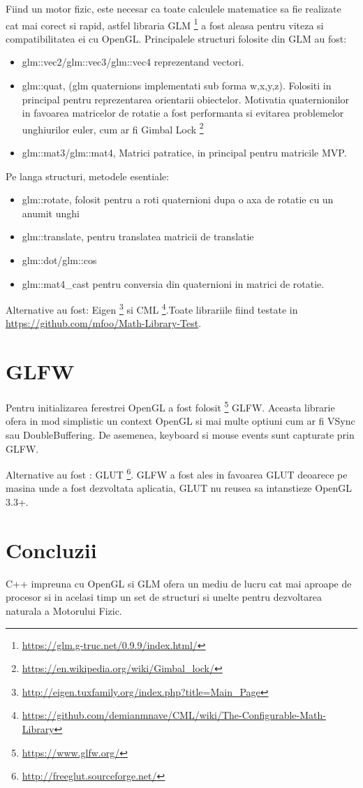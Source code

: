 Fiind un motor fizic, este necesar ca toate calculele matematice sa fie realizate cat mai corect si rapid, astfel libraria GLM \footnote{\url{https://glm.g-truc.net/0.9.9/index.html/}} a fost aleasa pentru viteza si compatibilitatea ei cu OpenGL.
Principalele structuri folosite din GLM au fost:
\begin{itemize}
    \item glm::vec2/glm::vec3/glm::vec4 reprezentand vectori. 
    \item glm::quat, (glm quaternions implementati sub forma w,x,y,z). Folositi in principal pentru reprezentarea orientarii obiectelor. Motivatia quaternionilor in favoarea 
    matricelor de rotatie a fost performanta si evitarea problemelor unghiurilor euler, cum ar fi Gimbal Lock \footnote{\url{https://en.wikipedia.org/wiki/Gimbal_lock/}}
    \item glm::mat3/glm::mat4, Matrici patratice, in principal pentru matricile MVP.
\end{itemize}
Pe langa structuri, metodele esentiale:
\begin{itemize}
    \item glm::rotate, folosit pentru a roti quaternioni dupa o axa de rotatie cu un anumit unghi
    \item glm::translate, pentru translatea matricii de translatie
    \item glm::dot/glm::cos
    \item glm::mat4\_cast pentru conversia din quaternioni in matrici de rotatie.
\end{itemize}
Alternative au fost: Eigen \footnote{\url{http://eigen.tuxfamily.org/index.php?title=Main_Page}} si CML \footnote{\url{https://github.com/demianmnave/CML/wiki/The-Configurable-Math-Library}}.Toate librariile fiind testate in \url{https://github.com/mfoo/Math-Library-Test}.

\section{GLFW}
 
Pentru initializarea ferestrei OpenGL a fost folosit \footnote{\url{https://www.glfw.org/}} GLFW. Aceasta librarie ofera in mod simplistic un context OpenGL si mai multe optiuni cum ar fi VSync sau DoubleBuffering. De asemenea,
keyboard si mouse events sunt capturate prin GLFW.

Alternative au fost : GLUT \footnote{\url{http://freeglut.sourceforge.net/}}. GLFW a fost ales in favoarea GLUT deoarece pe masina unde a fost dezvoltata aplicatia, GLUT nu reusea sa intanstieze OpenGL 3.3+.

\section{Concluzii}

C++ impreuna cu OpenGL si GLM ofera un mediu de lucru cat mai aproape de procesor si in acelasi timp un set de structuri si unelte pentru dezvoltarea naturala a Motorului Fizic.